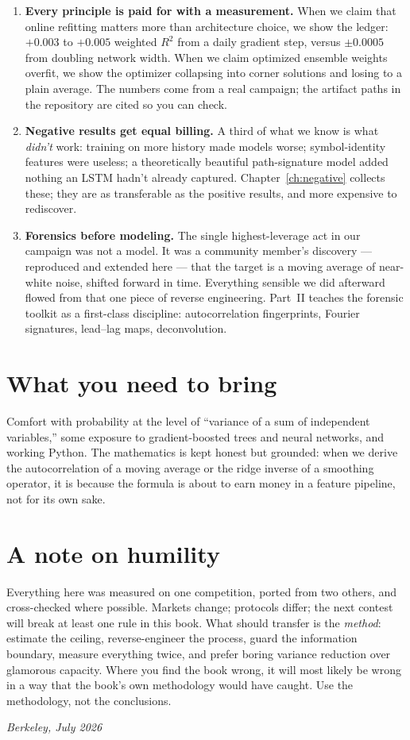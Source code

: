 \begin{enumerate}
\item \textbf{Every principle is paid for with a measurement.} When we claim
  that online refitting matters more than architecture choice, we show the
  ledger: $+0.003$ to $+0.005$ weighted $R^2$ from a daily gradient step,
  versus $\pm 0.0005$ from doubling network width. When we claim optimized
  ensemble weights overfit, we show the optimizer collapsing into corner
  solutions and losing to a plain average. The numbers come from a real
  campaign; the artifact paths in the repository are cited so you can check.
\item \textbf{Negative results get equal billing.} A third of what we know is
  what \emph{didn't} work: training on more history made models worse;
  symbol-identity features were useless; a theoretically beautiful
  path-signature model added nothing an LSTM hadn't already captured.
  Chapter~\ref{ch:negative} collects these; they are as transferable as the
  positive results, and more expensive to rediscover.
\item \textbf{Forensics before modeling.} The single highest-leverage act in
  our campaign was not a model. It was a community member's discovery ---
  reproduced and extended here --- that the target is a moving average of
  near-white noise, shifted forward in time. Everything sensible we did
  afterward flowed from that one piece of reverse engineering. Part~II
  teaches the forensic toolkit as a first-class discipline: autocorrelation
  fingerprints, Fourier signatures, lead--lag maps, deconvolution.
\end{enumerate}

\section*{What you need to bring}

Comfort with probability at the level of ``variance of a sum of independent
variables,'' some exposure to gradient-boosted trees and neural networks, and
working Python. The mathematics is kept honest but grounded: when we derive
the autocorrelation of a moving average or the ridge inverse of a smoothing
operator, it is because the formula is about to earn money in a feature
pipeline, not for its own sake.

\section*{A note on humility}

Everything here was measured on one competition, ported from two others, and
cross-checked where possible. Markets change; protocols differ; the next
contest will break at least one rule in this book. What should transfer is
the \emph{method}: estimate the ceiling, reverse-engineer the process, guard
the information boundary, measure everything twice, and prefer boring
variance reduction over glamorous capacity. Where you find the book wrong,
it will most likely be wrong in a way that the book's own methodology would
have caught. Use the methodology, not the conclusions.

\vspace{2em}
\noindent\textit{Berkeley, July 2026}
